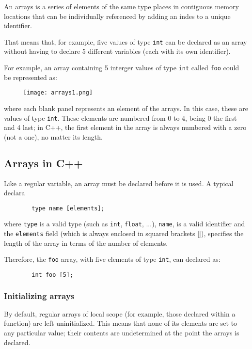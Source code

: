 \documentclass[12pt]{article}
\begin{document}
\begin{itemize}
	An arrays is a series of elements of the same type places in contiguous memory locations that can be individually referenced by adding an indes to a unique identifier. 

	That means that, for example, five values of type \verb"int" can be declared as an array without having to declare 5 different variables (each with its own identifier). 

	For example, an array containing 5 interger values of type \verb"int" called \verb"foo" could be represented as: 


	\begin{figure}[h]
	\texttt{[image: arrays1.png]}
	\centering
	\end{figure}

	where each blank panel represents an element of the arrays. In this case, these are values of type \verb"int". These elements are numbered from 0 to 4, being 0 the first and 4 last; in C++, the first element in the array is always numbered with a zero (not a one), no matter its length. 


	\subsection{Arrays in C++}


		Like a regular variable, an array must be declared before it is used. A typical declara
		\begin{verbatim}
		type name [elements]; 
		\end{verbatim}
		where \verb"type" is a valid type (such as \verb"int", \verb"float", ...), \verb"name",  is a valid identifier and the \verb"elements" field (which is always enclosed in squared brackets []), specifies the length of the array in terms of the number of elements. 

		Therefore, the \verb"foo" array, with five elements of type \verb"int", can declared as: 

		\begin{verbatim}
		int foo [5]; 
		\end{verbatim}


		\subsubsection{Initializing arrays}

			By default, regular arrays of local scope (for example, those declared within a function) are left uninitialized. This means that none of its elements are set to any particular value; their contents are undetermined at the point the arrays is declared. 


\end{itemize}
\end{document}
